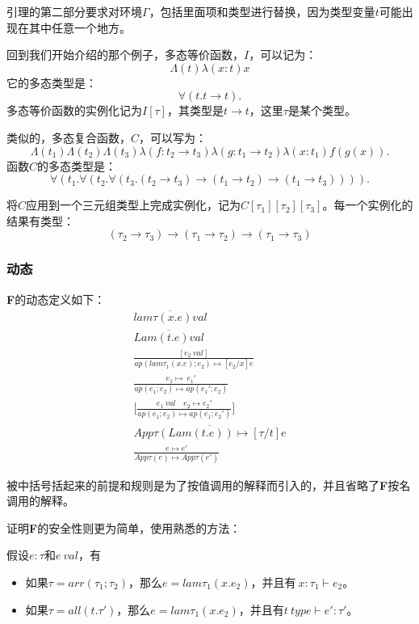 引理的第二部分要求对环境$\Gamma$，包括里面项和类型进行替换，因为类型变量$t$可能出现在其中任意一个地方。

回到我们开始介绍的那个例子，多态等价函数，$I$，可以记为：
$$\Lambda (t) \lambda (x:t) x$$
它的多态类型是：
$$\forall (t.t \to t).$$
多态等价函数的实例化记为$I[\tau]$，其类型是$t \to t$，这里$\tau$是某个类型。

类似的，多态复合函数，$C$，可以写为：
$$\Lambda (t_1) \Lambda (t_2) \Lambda (t_3) \lambda (f:t_2 \to t_3) \lambda (g:t_1 \to t_2) \lambda (x:t_1) f(g(x)).$$
函数$C$的多态类型是：
$$\forall (t_1.\forall (t_2.\forall(t_3. (t_2 \to t_3) \to (t_1 \to t_2) \to (t_1 \to t_3)))).$$

将$C$应用到一个三元组类型上完成实例化，记为$C[\tau_1][\tau_2][\tau_3]$。每一个实例化的结果有类型：
$$(\tau_2 \to \tau_3) \to (\tau_1 \to \tau_2) \to (\tau_1 \to \tau_3)$$

\subsubsection{动态}
\textbf{F}的动态定义如下：
\begin{gather}
  \overline{lam{\tau}(x.e)val}\\
  \overline{Lam(t.e)val}\\
  \frac{[e_2 \ val]}{ap(lam{\tau_1}(x.e);e_2) \longmapsto [e_2/x]e}\\
  \frac{e_1 \longmapsto \ e_1'}{ap(e_1;e_2) \longmapsto ap(e_1';e_2)}\\
  \lbrack \frac{e_1 \ val \quad e_2 \longmapsto e_2'}{ap(e_1;e_2) \longmapsto ap(e_1;e_2')} \rbrack \\
  \overline{App{\tau}(Lam(t.e))\longmapsto [\tau / t]e} \\
  \frac{e \longmapsto e'}{App{\tau}(e) \longmapsto App{\tau}(e')}
\end{gather}

被中括号括起来的前提和规则是为了按值调用的解释而引入的，并且省略了\textbf{F}按名调用的解释。

证明\textbf{F}的安全性则更为简单，使用熟悉的方法：

\begin{lemma}[规范形式]
  假设$e:\tau$和$e \ val$，有
  \begin{itemize}
    \item 如果$\tau=arr(\tau_1;\tau_2)$，那么$e=lam{\tau_1}(x.e_2)$，并且有$\ x:\tau_1 \vdash e_2 $。
    \item 如果$\tau=all(t.\tau')$，那么$e=lam{\tau_1}(x.e_2)$，并且有$t \ type \vdash e':\tau'$。
  \end{itemize}
\end{lemma}

